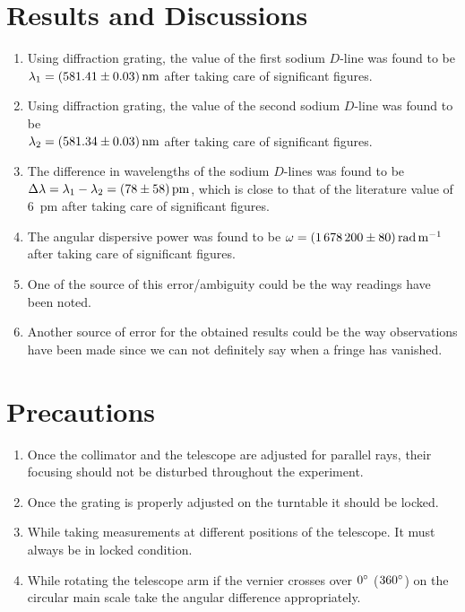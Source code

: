 \documentclass{article}
\begin{document}
    
    
    
\section{Results and Discussions}
\begin{enumerate}
    \item Using diffraction grating, the value of the first sodium $D$-line was found to be \\ $\lambda_1 = \SI[separate-uncertainty=true]{581.41 \pm 0.03}{\nano \metre}$ after taking care of significant figures.
    \item Using diffraction grating, the value of the second sodium $D$-line was found to be \\ $\lambda_2 = \SI[separate-uncertainty=true]{581.34 \pm 0.03}{\nano \metre}$ after taking care of significant figures.
    \item The difference in wavelengths of the sodium $D$-lines was found to be \\ $\Delta \lambda = \lambda_1 - \lambda_2 = \SI[separate-uncertainty=true]{78 \pm 58}{\pico \metre}$, which is close to that of the literature value of \SI{6}{\pico \metre} after taking care of significant figures.
    \item The angular dispersive power was found to be $\omega = \SI[separate-uncertainty=true]{1678200 \pm 80}{\radian \per \metre}$ after taking care of significant figures.
    \item One of the source of this error/ambiguity could be the way readings have been noted.
    \item Another source of error for the obtained results could be the way observations have been made since we can not definitely say when a fringe has vanished.

\end{enumerate}

\section{Precautions}
\begin{enumerate}
    \item Once the collimator and the telescope are adjusted for parallel rays, their focusing should not be disturbed throughout the experiment. 
    \item Once the grating is properly adjusted on the turntable it should be locked. 
    \item While taking measurements at different positions of the telescope. It must always be in locked condition. 
    \item While rotating the telescope arm if the vernier crosses over $0 \degree$ ($360 \degree$) on the circular main scale take the angular difference appropriately.
\end{enumerate}
\end{document}
